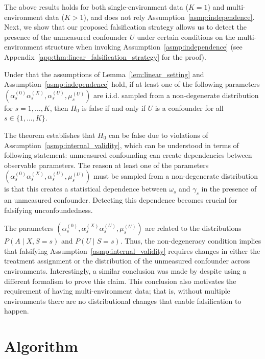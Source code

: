 \documentclass{article}
\begin{document}
The above results holds for both single-environment data ($K=1$) and multi-environment data ($K>1$), and does not rely Assumption~\ref*{asmp:independence}. Next, we show that our proposed falsification strategy allows us to detect the presence of the unmeasured confounder $U$ under certain conditions on the multi-environment structure when invoking Assumption~\ref*{asmp:independence} (see Appendix~\ref{app:thm:linear_falsification_strategy} for the proof).
\begin{theorem}\label{thm:linear_falsification_strategy}
    Under that the assumptions of Lemma~\ref{lem:linear_setting} and Assumption~\ref*{asmp:independence} hold, if at least one of the following parameters $(\alpha_{s}^{(0)} \alpha_{s}^{(X)}, \alpha_{s}^{(U)},\mu_{s}^{(U)})$ are i.i.d. sampled from a non-degenerate distribution for $s=1,\dots,K$, then $H_0$ is false if and only if $U$ is a confounder for all $s\in\{1,\dots,K\}$.
\end{theorem}
The theorem establishes that $H_0$ can be false due to violations of Assumption~\ref*{asmp:internal_validity}, which can be understood in terms of following statement: unmeasured confounding can create dependencies between observable parameters. The reason at least one of the parameters $(\alpha_{s}^{(0)} \alpha_{s}^{(X)}, \alpha_{s}^{(U)},\mu_{s}^{(U)})$ must be sampled from a non-degenerate distribution is that this creates a statistical dependence between $\omega_s$ and $\gamma_s$ in the presence of an unmeasured confounder. Detecting this dependence becomes crucial for falsifying unconfoundedness.

The parameters $(\alpha_{s}^{(0)}, \alpha_{s}^{(X)}\alpha_{s}^{(U)},\mu_{s}^{(U)})$ are related to the distributions $P(A\mid X,S=s)$ and $P(U\mid S=s)$. Thus, the non-degeneracy condition implies that falsifying Assumption~\ref*{asmp:internal_validity} requires changes in either the treatment assignment or the distribution of the unmeasured confounder across environments. Interestingly, a similar conclusion was made by \citet{karlsson2023detecting} despite using a different formalism to prove this claim. This conclusion also motivates the requirement of having multi-environment data; that is, without multiple environments  there are no distributional changes that enable falsification to happen.

\section{Algorithm}
\end{document}
